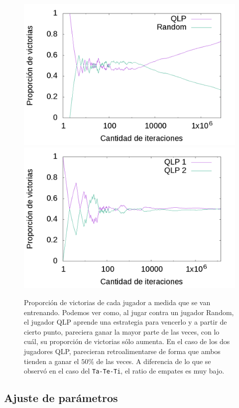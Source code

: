 \documentclass[10pt, a4paper]{article}
\begin{document}
\begin{figure}[H]
  \begin{minipage}[c]{1\textwidth}
	\includegraphics[scale=0.25]{Initial/QvR.png}
	\includegraphics[scale=0.25]{Initial/QvQ.png}
  \end{minipage}
  \caption{Proporción de victorias de cada jugador a medida que se van entrenando. Podemos ver como, al jugar contra un jugador Random, el jugador QLP aprende una estrategia para vencerlo y a partir de cierto punto, pareciera ganar la mayor parte de las veces, con lo cuál, su proporción de victorias sólo aumenta. En el caso de los dos jugadores QLP, parecieran retroalimentarse de forma que ambos tienden a ganar el $50\%$ de las veces. A diferencia de lo que se observó en el caso del \texttt{Ta-Te-Ti}, el ratio de empates es muy bajo.}
\end{figure}


\subsection{Ajuste de parámetros}
\end{document}
